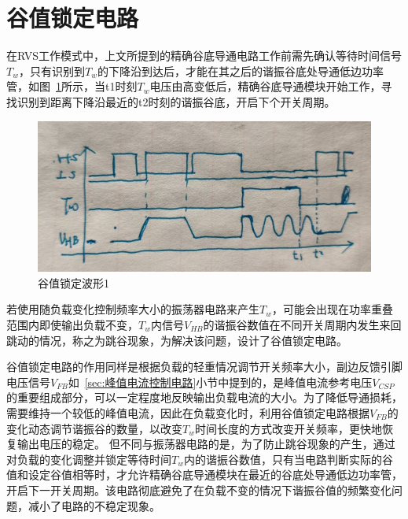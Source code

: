 



\section{谷值锁定电路}

在RVS工作模式中，上文所提到的精确谷底导通电路工作前需先确认等待时间信号$T_w$，只有识别到$T_w$的下降沿到达后，才能在其之后的谐振谷底处导通低边功率管，如图~\ref{fig:谷值锁定波形1}所示，当t1时刻$T_w$电压由高变低后，精确谷底导通模块开始工作，寻找识别到距离下降沿最近的t2时刻的谐振谷底，开启下个开关周期。

\begin{figure}[htbp] 
    \centering
    \includegraphics[width=0.6\linewidth]{figures/谷值锁定波形1.jpg}
    \caption{谷值锁定波形1}
    \label{fig:谷值锁定波形1}
\end{figure} 

若使用随负载变化控制频率大小的振荡器电路来产生$T_w$，可能会出现在功率重叠范围内即使输出负载不变，$T_w$内信号$V_{HB}$的谐振谷数值在不同开关周期内发生来回跳动的情况，称之为跳谷现象，为解决该问题，设计了谷值锁定电路。

谷值锁定电路的作用同样是根据负载的轻重情况调节开关频率大小，副边反馈引脚电压信号$V_{FB}$如~\ref{sec:峰值电流控制电路}小节中提到的，是峰值电流参考电压$V_{CSP}$的重要组成部分，可以一定程度地反映输出负载电流的大小。为了降低导通损耗，需要维持一个较低的峰值电流，因此在负载变化时，利用谷值锁定电路根据$V_{FB}$的变化动态调节谐振谷的数量，以改变$T_w$时间长度的方式改变开关频率，更快地恢复输出电压的稳定。
但不同与振荡器电路的是，为了防止跳谷现象的产生，通过对负载的变化调整并锁定等待时间$T_w$内的谐振谷数值，只有当电路判断实际的谷值和设定谷值相等时，才允许精确谷底导通模块在最近的谷底处导通低边功率管，开启下一开关周期。该电路彻底避免了在负载不变的情况下谐振谷值的频繁变化问题，减小了电路的不稳定现象。

